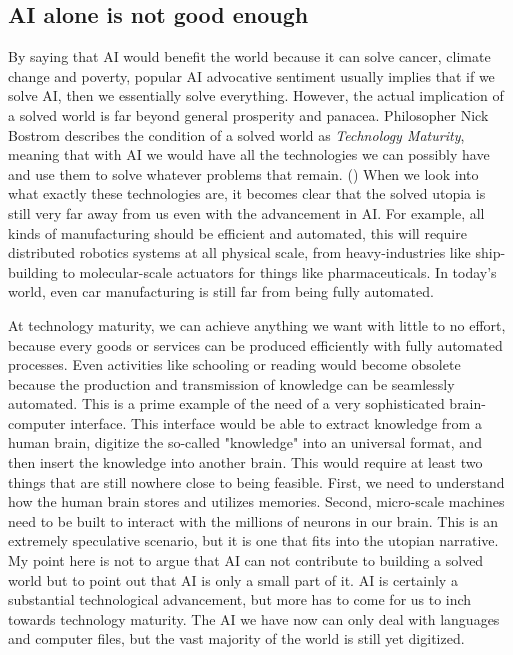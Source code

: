 \documentclass[12pt]{article}
\begin{document}
\subsection{AI alone is not good enough}
By saying that AI would benefit the world because it can solve cancer, climate change and poverty, popular AI advocative sentiment usually implies that if we solve AI, then we essentially solve everything. However, the actual implication of a solved world is far beyond general prosperity and panacea. Philosopher Nick Bostrom describes the condition of a solved world as \textit{Technology Maturity}, meaning that with AI we would have all the technologies we can possibly have and use them to solve whatever problems that remain. (\cite{bostromdeeputopia}) When we look into what exactly these technologies are, it becomes clear that the solved utopia is still very far away from us even with the advancement in AI. For example, all kinds of manufacturing should be efficient and automated, this will require distributed robotics systems at all physical scale, from heavy-industries like ship-building to molecular-scale actuators for things like pharmaceuticals. In today's world, even car manufacturing is still far from being fully automated.

At technology maturity, we can achieve anything we want with little to no effort, because every goods or services can be produced efficiently with fully automated processes. Even activities like schooling or reading would become obsolete because the production and transmission of knowledge can be seamlessly automated. This is a prime example of the need of a very sophisticated brain-computer interface. This interface would be able to extract knowledge from a human brain, digitize the so-called "knowledge" into an universal format, and then insert the knowledge into another brain. This would require at least two things that are still nowhere close to being feasible. First, we need to understand how the human brain stores and utilizes memories. Second, micro-scale machines need to be built to interact with the millions of neurons in our brain. This is an extremely speculative scenario, but it is one that fits into the utopian narrative. My point here is not to argue that AI can not contribute to building a solved world but to point out that AI is only a small part of it. AI is certainly a substantial technological advancement, but more has to come for us to inch towards technology maturity. The AI we have now can only deal with languages and computer files, but the vast majority of the world is still yet digitized.
\end{document}
